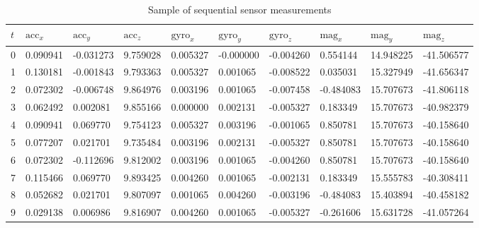 \documentclass[12pt, titlepage]{article}
\begin{document}
\begin{landscape}
\begin{table}[]
    \centering
    \caption{Sample of sequential sensor measurements}
    \label{tab:gt_data}
    \begin{tabular}{|l||l|l|l|l|l|l|l|l|l|}
    \hline
    {$t$} & {$\text{acc}_x$} & {$\text{acc}_y$} & {$\text{acc}_z$} &
    {$\text{gyro}_x$} & {$\text{gyro}_y$} & {$\text{gyro}_z$} &
    {$\text{mag}_x$} & {$\text{mag}_y$} & {$\text{mag}_z$} \\ \hline \hline
    0 & 0.090941 & -0.031273 & 9.759028 & 0.005327 & -0.000000 & -0.004260 & 0.554144  & 14.948225 &
    -41.506577 \\ \hline
    1 & 0.130181 & -0.001843 & 9.793363 & 0.005327 & 0.001065  & -0.008522 & 0.035031  & 15.327949 &
    -41.656347 \\ \hline
    2 & 0.072302 & -0.006748 & 9.864976 & 0.003196 & 0.001065  & -0.007458 & -0.484083 & 15.707673 &
    -41.806118 \\ \hline
    3 & 0.062492 & 0.002081  & 9.855166 & 0.000000 & 0.002131  & -0.005327 & 0.183349  & 15.707673 &
    -40.982379 \\ \hline
    4 & 0.090941 & 0.069770  & 9.754123 & 0.005327 & 0.003196  & -0.001065 & 0.850781  & 15.707673 &
    -40.158640 \\ \hline
    5 & 0.077207 & 0.021701  & 9.735484 & 0.003196 & 0.002131  & -0.005327 & 0.850781  & 15.707673 &
    -40.158640 \\ \hline
    6 & 0.072302 & -0.112696 & 9.812002 & 0.003196 & 0.001065  & -0.004260 & 0.850781  & 15.707673 &
    -40.158640 \\ \hline
    7 & 0.115466 & 0.069770  & 9.893425 & 0.004260 & 0.001065  & -0.002131 & 0.183349  & 15.555783 &
    -40.308411 \\ \hline
    8 & 0.052682 & 0.021701  & 9.807097 & 0.001065 & 0.004260  & -0.003196 & -0.484083 & 15.403894 &
    -40.458182 \\ \hline
    9 & 0.029138 & 0.006986  & 9.816907 & 0.004260 & 0.001065  & -0.005327 & -0.261606 & 15.631728 &
    -41.057264 \\ \hline
    \end{tabular}
    \end{table}
\end{landscape}
\end{document}
